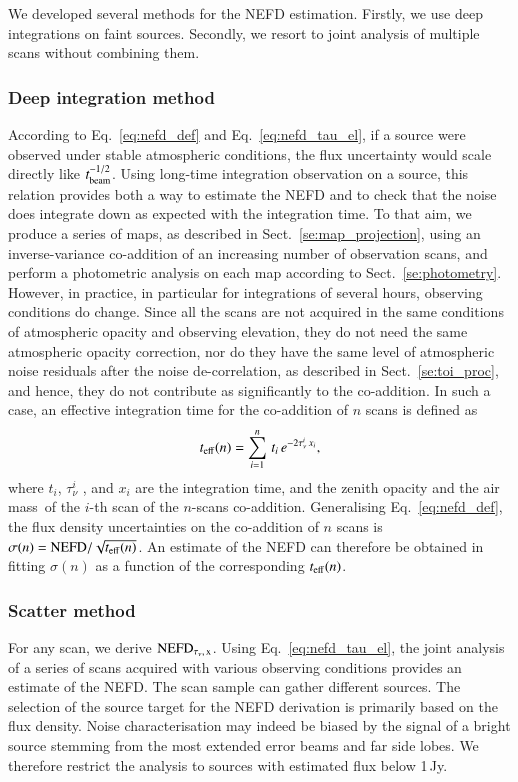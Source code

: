\documentclass[traditionalabstract]{aa}
\newcommand{\taunu}{\tau_{\nu}}
\newcommand{\airmass}{air mass}
\newcommand{\lp}[1]{#1}
\newcommand{\rev}[1]{#1}
\begin{document}
{We developed several methods for the NEFD estimation. Firstly,
we use deep integrations on faint sources. Secondly, we resort to joint
analysis of multiple scans without combining them.

\subsubsection{Deep integration method}
According to Eq.~\ref{eq:nefd_def} and Eq.~\ref{eq:nefd_tau_el}, if a
source were observed under stable atmospheric conditions, the flux
uncertainty would scale directly like
$t_{\rm{beam}}^{-1/2}$. Using long-time integration observation on a
source, this relation provides both a way to estimate the NEFD and to
check that the noise does integrate down as expected with the integration
time. To that aim, we produce a series of maps, as described in Sect.~\ref{se:map_projection},
using an inverse-variance co-addition of an increasing number of observation
scans, and perform a photometric analysis on each map according to
Sect.~\ref{se:photometry}. However, in practice, in particular for
integrations of several hours, observing conditions do change.
Since all the scans are not acquired in the same conditions of
atmospheric opacity and observing elevation, {\rev they do not need
the same atmospheric opacity correction, nor do they have
the same level of atmospheric noise residuals after the noise
de-correlation, as described in Sect.~\ref{se:toi_proc}}, and hence,
they do not contribute as significantly to
the co-addition. In such a case, an effective integration time for the
co-addition of $n$ scans is defined as
%
\begin{equation}
t_{\rm{eff}}(n) = \sum_{i=1}^{n}\, t_i\,  e^{-2\taunu^i\, x_i},
\label{eq:sigma_tau_w8}
\end{equation}
%
where $t_i$, $\taunu^i$ , and $x_i$ are the integration time, and the zenith
opacity and the \airmass\ of the $i$-th scan of the $n$-scans
co-addition.
Generalising Eq.~\ref{eq:nefd_def}, the flux density uncertainties on
the co-addition of $n$ scans is $\sigma(n) = \rm{NEFD}/\sqrt{t_{\rm{eff}}(n)}$.
An estimate of the
NEFD can therefore be obtained in fitting
$\sigma(n)$ as a function of the corresponding $t_{\rm{eff}}(n)$.

\subsubsection{Scatter method}
For any scan, we derive $\rm{NEFD}_{\taunu,\, x}$.
Using Eq.~\ref{eq:nefd_tau_el}, the joint analysis of a series of
scans acquired with various observing conditions provides an estimate
of the NEFD. The scan sample can gather different sources. 
The selection of the source target for the NEFD derivation is
primarily based on the flux density. Noise
characterisation may indeed be biased {\lp by the signal of a bright source
stemming from the most extended error beams and far side lobes.}
We therefore restrict the analysis to sources with estimated flux below 1\,Jy.

}
\end{document}
